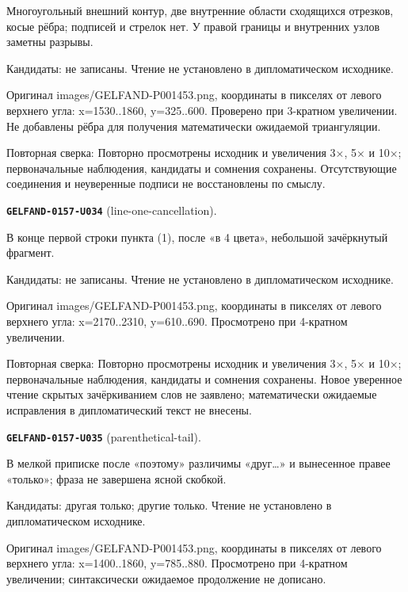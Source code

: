 Многоугольный внешний контур, две внутренние области сходящихся отрезков, косые рёбра; подписей и стрелок нет. У правой границы и внутренних узлов заметны разрывы.\par
Кандидаты: не записаны. Чтение не установлено в дипломатическом исходнике.\par
Оригинал images/GELFAND-P001453.png, координаты в пикселях от левого верхнего угла: x=1530..1860, y=325..600. Проверено при 3-кратном увеличении. Не добавлены рёбра для получения математически ожидаемой триангуляции.\par
Повторная сверка: Повторно просмотрены исходник и увеличения 3×, 5× и 10×; первоначальные наблюдения, кандидаты и сомнения сохранены. Отсутствующие соединения и неуверенные подписи не восстановлены по смыслу.\par\medskip
\par\noindent\leavevmode{}\label{GELFAND-0157-U034}\label{GELFAND-P001453:line-one-cancellation}\textbf{\texttt{GELFAND-0157-U034}} (line-one-cancellation).\nopagebreak[4]\par
В конце первой строки пункта (1), после «в 4 цвета», небольшой зачёркнутый фрагмент.\par
Кандидаты: не записаны. Чтение не установлено в дипломатическом исходнике.\par
Оригинал images/GELFAND-P001453.png, координаты в пикселях от левого верхнего угла: x=2170..2310, y=610..690. Просмотрено при 4-кратном увеличении.\par
Повторная сверка: Повторно просмотрены исходник и увеличения 3×, 5× и 10×; первоначальные наблюдения, кандидаты и сомнения сохранены. Новое уверенное чтение скрытых зачёркиванием слов не заявлено; математически ожидаемые исправления в дипломатический текст не внесены.\par\medskip
\par\noindent\leavevmode{}\label{GELFAND-0157-U035}\label{GELFAND-P001453:parenthetical-tail}\textbf{\texttt{GELFAND-0157-U035}} (parenthetical-tail).\nopagebreak[4]\par
В мелкой приписке после «поэтому» различимы «друг…» и вынесенное правее «только»; фраза не завершена ясной скобкой.\par
Кандидаты: другая только; другие только. Чтение не установлено в дипломатическом исходнике.\par
Оригинал images/GELFAND-P001453.png, координаты в пикселях от левого верхнего угла: x=1400..1860, y=785..880. Просмотрено при 4-кратном увеличении; синтаксически ожидаемое продолжение не дописано.\par
